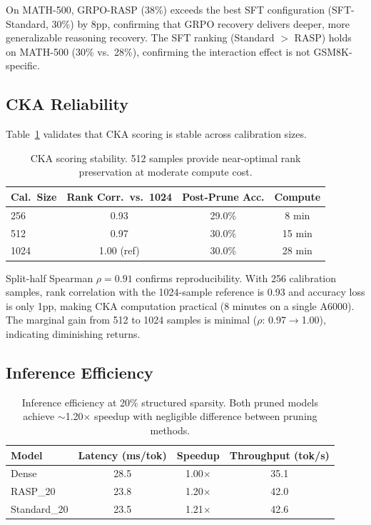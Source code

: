 \documentclass[11pt]{article}
\begin{document}
On MATH-500, GRPO-RASP (38\%) exceeds the best SFT configuration (SFT-Standard, 30\%) by 8pp, confirming that GRPO recovery delivers deeper, more generalizable reasoning recovery. The SFT ranking (Standard $>$ RASP) holds on MATH-500 (30\% vs.\ 28\%), confirming the interaction effect is not GSM8K-specific.

\subsection{CKA Reliability}
\label{sec:reliability}

Table~\ref{tab:reliability} validates that CKA scoring is stable across calibration sizes.

\begin{table}[t]
\centering
\caption{CKA scoring stability. 512 samples provide near-optimal rank preservation at moderate compute cost.}
\label{tab:reliability}
\begin{tabular}{lccc}
\toprule
\textbf{Cal.\ Size} & \textbf{Rank Corr.\ vs.\ 1024} & \textbf{Post-Prune Acc.} & \textbf{Compute} \\
\midrule
256 & 0.93 & 29.0\% & 8 min \\
512 & 0.97 & 30.0\% & 15 min \\
1024 & 1.00 (ref) & 30.0\% & 28 min \\
\bottomrule
\end{tabular}
\end{table}

Split-half Spearman $\rho = 0.91$ confirms reproducibility. With 256 calibration samples, rank correlation with the 1024-sample reference is 0.93 and accuracy loss is only 1pp, making CKA computation practical (8 minutes on a single A6000). The marginal gain from 512 to 1024 samples is minimal ($\rho$: 0.97$\rightarrow$1.00), indicating diminishing returns.

\subsection{Inference Efficiency}
\label{sec:efficiency}

\begin{table}[t]
\centering
\caption{Inference efficiency at 20\% structured sparsity. Both pruned models achieve ${\sim}$1.20$\times$ speedup with negligible difference between pruning methods.}
\label{tab:efficiency}
\begin{tabular}{lccc}
\toprule
\textbf{Model} & \textbf{Latency (ms/tok)} & \textbf{Speedup} & \textbf{Throughput (tok/s)} \\
\midrule
Dense & 28.5 & 1.00$\times$ & 35.1 \\
RASP\_20 & 23.8 & 1.20$\times$ & 42.0 \\
Standard\_20 & 23.5 & 1.21$\times$ & 42.6 \\
\bottomrule
\end{tabular}
\end{table}
\end{document}
